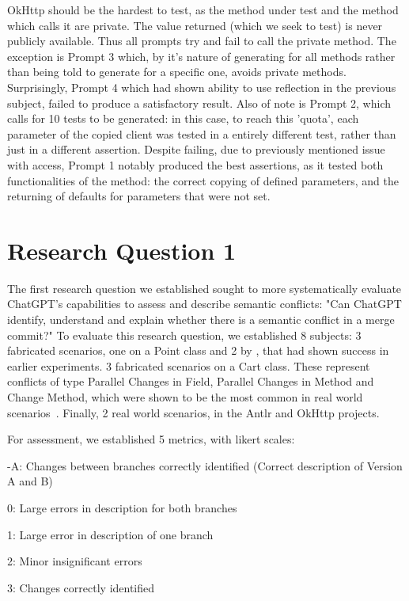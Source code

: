 OkHttp should be the hardest to test, as the method under test and the method which calls it are private. The value returned (which we seek to test) is never publicly available.
Thus all prompts try and fail to call the private method. The exception is Prompt 3 which, by it's nature of generating for all methods rather than being told to generate for a specific one, avoids private methods. Surprisingly, Prompt 4 which had shown ability to use reflection in the previous subject, failed to produce a satisfactory result. Also of note is Prompt 2, which calls for 10 tests to be generated: in this case, to reach this 'quota', each parameter of the copied client was tested in a entirely different test, rather than just in a different assertion.
Despite failing, due to previously mentioned issue with access, Prompt 1 notably produced the best assertions, as it tested both functionalities of the method: the correct copying of defined parameters, and the returning of defaults for parameters that were not set.

\section{Research Question 1}

The first research question we established sought to more systematically evaluate ChatGPT's capabilities to assess and describe semantic conflicts: "Can ChatGPT identify, understand and explain whether there is a semantic conflict in a merge commit?"
To evaluate this research question, we established 8 subjects:
3 fabricated scenarios, one on a Point class and 2 by \citet{kn:nuno}, that had shown success in earlier experiments.
3 fabricated scenarios on a Cart class. These represent conflicts of type Parallel Changes in Field, Parallel Changes in Method and Change Method, which were shown to be the most common in real world scenarios~\cite{kn:nuno}. Finally, 2 real world scenarios, in the Antlr and OkHttp projects.


For assessment, we established 5 metrics, with likert scales:

-A: Changes between branches correctly identified (Correct description of Version A and B)

0: Large errors in description for both branches

1: Large error in description of one branch

2: Minor insignificant errors

3: Changes correctly identified

